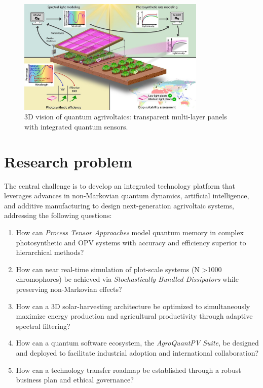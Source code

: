 \documentclass[12pt, a4paper]{article}
\begin{document}
\begin{figure}[htb]
    \centering
    \includegraphics[width=0.8\textwidth]{agri-photovoltaic.jpg}
    \caption{3D vision of quantum agrivoltaics: transparent multi-layer panels with integrated quantum sensors.}
    \label{fig_agrivoltaic_3d}
\end{figure}

\section{Research problem}

The central challenge is to develop an integrated technology platform that leverages advances in non-Markovian quantum dynamics, artificial intelligence, and additive manufacturing to design next-generation agrivoltaic systems, addressing the following questions:
\begin{enumerate}
  \item How can \textit{Process Tensor Approaches} model quantum memory in complex photosynthetic and OPV systems with accuracy and efficiency superior to hierarchical methods?

  \item How can near real-time simulation of plot-scale systems (N \num{>1000} chromophores) be achieved via \textit{Stochastically Bundled Dissipators} while preserving non-Markovian effects?

  \item How can a 3D solar-harvesting architecture be optimized to simultaneously maximize energy production and agricultural productivity through adaptive spectral filtering?

  \item How can a quantum software ecosystem, the \textit{AgroQuantPV Suite}, be designed and deployed to facilitate industrial adoption and international collaboration?

  \item How can a technology transfer roadmap be established through a robust business plan and ethical governance?
\end{enumerate}
\end{document}
